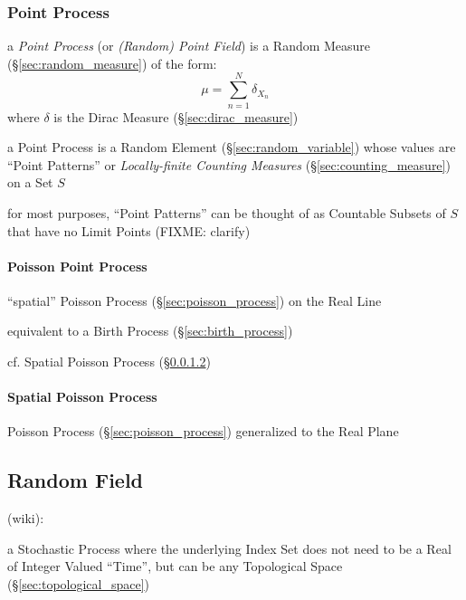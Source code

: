 \subsubsection{Point Process}\label{sec:point_process}

a \emph{Point Process} (or \emph{(Random) Point Field}) is a Random Measure
(\S\ref{sec:random_measure}) of the form:
\[
  \mu = \sum_{n=1}^N \delta_{X_n}
\]
where $\delta$ is the Dirac Measure (\S\ref{sec:dirac_measure})

a Point Process is a Random Element (\S\ref{sec:random_variable}) whose values
are ``Point Patterns'' or \emph{Locally-finite Counting Measures}
(\S\ref{sec:counting_measure}) on a Set $S$

for most purposes, ``Point Patterns'' can be thought of as Countable Subsets of
$S$ that have no Limit Points (FIXME: clarify)



\paragraph{Poisson Point Process}\label{sec:point_poisson}\hfill

``spatial'' Poisson Process (\S\ref{sec:poisson_process}) on the Real Line

equivalent to a Birth Process (\S\ref{sec:birth_process})

cf. Spatial Poisson Process (\S\ref{sec:spatial_poisson})



\paragraph{Spatial Poisson Process}\label{sec:spatial_poisson}\hfill

Poisson Process (\S\ref{sec:poisson_process}) generalized to the Real Plane



\subsection{Random Field}\label{sec:random_field}

(wiki):

a Stochastic Process where the underlying Index Set does not need to be a Real
of Integer Valued ``Time'', but can be any Topological Space
(\S\ref{sec:topological_space})

